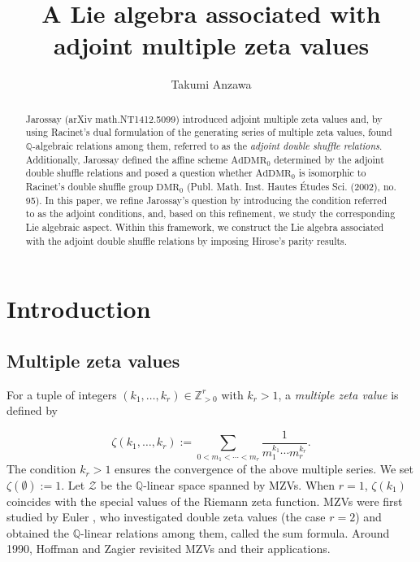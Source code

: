 \documentclass[15pt,oneside,reqno]{amsart}
\title[A Lie algebra associated with AMZVs]{A Lie algebra associated with adjoint multiple zeta values}
\author{Takumi Anzawa}
\theoremstyle{remark}{
\newtheorem{lem}[df]{Lemma}
\newtheorem{prop}[df]{Proposition}
\newtheorem{ex}[df]{Example}
\newtheorem{rmk}[df]{Remark}
}
\newcommand{\Q}{\mathbb{Q}}
\begin{document}
\maketitle



\begin{abstract}
Jarossay (arXiv math.NT1412.5099) introduced adjoint multiple zeta values and, by using Racinet's dual formulation of the generating series of multiple zeta values, found $\mathbb{Q}$-algebraic relations among them, referred to as the \textit{adjoint double shuffle relations}.
Additionally, Jarossay defined the affine scheme $\mathrm{AdDMR}_0$ determined by the adjoint double shuffle relations and posed a question whether $\mathrm{AdDMR}_0$ is isomorphic to Racinet's double shuffle group $\mathrm{DMR}_0$ (Publ. Math. Inst. Hautes \'{E}tudes Sci. (2002), no. 95). 
In this paper, we refine Jarossay's question by introducing the condition referred to as the adjoint conditions, and, based on this refinement, we study the corresponding Lie algebraic aspect.
Within this framework, we construct the Lie algebra associated with the adjoint double shuffle relations by imposing Hirose's parity results.
\end{abstract}

\tableofcontents


\section{Introduction}



\subsection{Multiple zeta values}



For a tuple of integers $(k_1,\ldots,k_r)\in\mathbb{Z}_{>0}^r$ with $k_r>1$, a \emph{multiple zeta value} is defined by

\[
\zeta(k_1,\ldots,k_r) := \sum_{0<m_1<\cdots <m_r} \frac{1}{m_1^{k_1}\cdots m_r^{k_r}}.
\]
The condition $k_r>1$ ensures the convergence of the above multiple series.
We set $\zeta(\emptyset) := 1$.
Let $\mathcal{Z}$ be the $\mathbb{Q}$-linear space spanned by MZVs.
When $r=1$, $\zeta(k_1)$ coincides with the special values of the Riemann zeta function.
MZVs were first studied by Euler \cite{Euler}, who investigated double zeta values (the case $r=2$) and obtained the $\Q$-linear relations among them, called the sum formula.
Around 1990, Hoffman \cite{Hoffman-92} and Zagier \cite{Zagier-92} revisited MZVs and their applications.
\end{document}
